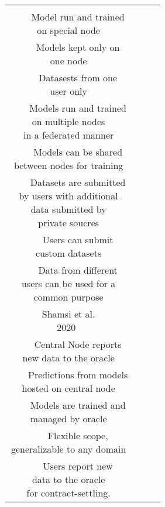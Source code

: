\documentclass{article}
\newcommand{\tabitem}{\\~~\llap{\textbullet}~~}
\begin{document}
\begin{table}[H]
\begin{center}
\begin{tabular}{c|c|c|c}
{                    \tabitem Model run and trained\\on special node\\
                    \tabitem Models kept only on\\one node\\
                    \tabitem Datasests from one\\user only\\
                } & \makecell[l]{
                    \tabitem Models run and trained\\on multiple nodes\\in a federated manner\\
                    \tabitem Models can be shared\\between nodes for training\\
                    \tabitem Datasets are submitted\\by users with additional\\data submitted by\\private soucres\\
                } & \makecell[l]{
                    \tabitem Users can submit\\custom datasets\\
                    \tabitem Data from different\\users can be used for a\\common purpose\\
                }\\\hline
                \makecell[l]{Shamsi et al.\\2020~\cite{windForcasting}} &
                \makecell[l]{
                    \tabitem Central Node reports \\ new data to the oracle \\
                    \tabitem Predictions from models \\ hosted on central node \\
                    \tabitem Models are trained and\\managed by oracle\\
                    \tabitem Flexible scope,\\generalizable to any domain\\
                } &
                \makecell[l]{
                    \tabitem Users report new \\ data to the oracle \\ for contract-settling.  \\
}
\end{tabular}
\end{center}
\end{table}
\end{document}
